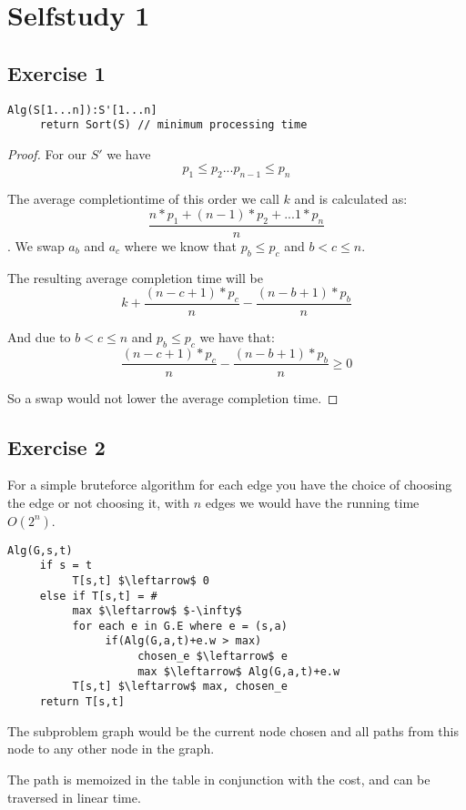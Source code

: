 \documentclass[12pt,a4paper]{report}
\begin{document}
\chapter*{Selfstudy 1}
\section*{Exercise 1}
\begin{lstlisting}
Alg(S[1...n]):S'[1...n]
     return Sort(S) // minimum processing time
\end{lstlisting}

\begin{proof}
For our $S'$ we have 
$$p_1 \leq p_2 ... p_{n-1} \leq p_n$$


The average completiontime of this order we call $k$ and is calculated as:
$$\frac{n*p_1 + (n-1)*p_2 + ... 1 * p_n}{n}$$. We swap $a_b$ and $a_c$ where we know that $p_b \leq p_c$ and $b < c \leq n$.

The resulting average completion time will be 
$$k + \frac{(n-c +1)*p_c}{n} - \frac{(n-b +1)*p_b}{n}$$

And due to $b < c \leq n$ and $p_b \leq p_c$ we have that:
$$\frac{(n-c +1)*p_c}{n} - \frac{(n-b +1)*p_b}{n} \geq 0$$

So a swap would not lower the average completion time.
\end{proof}

\section*{Exercise 2}
For a simple bruteforce algorithm for each edge you have the choice of choosing the edge or not choosing it, with $n$ edges we would have the running time $O(2^n)$.

\begin{lstlisting}
Alg(G,s,t)
     if s = t
          T[s,t] $\leftarrow$ 0
     else if T[s,t] = #
          max $\leftarrow$ $-\infty$
          for each e in G.E where e = (s,a)
               if(Alg(G,a,t)+e.w > max)
                    chosen_e $\leftarrow$ e                    
                    max $\leftarrow$ Alg(G,a,t)+e.w
          T[s,t] $\leftarrow$ max, chosen_e
     return T[s,t]
\end{lstlisting}

The subproblem graph would be the current node chosen and all paths from this node to any other node in the graph.

The path is memoized in the table in conjunction with the cost, and can be traversed in linear time.
\end{document}
